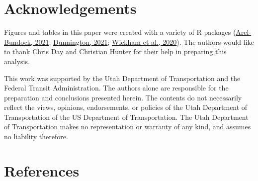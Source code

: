 \documentclass[3p, authoryear, review]{elsarticle} %
\begin{document}
\hypertarget{acks}{%
\section*{Acknowledgements}\label{acks}}

Figures and tables in this paper were created with a variety of R
packages (\protect\hyperlink{ref-R-modelsummary}{Arel-Bundock, 2021}; \protect\hyperlink{ref-R-ggspatial}{Dunnington, 2021}; \protect\hyperlink{ref-R-ggplot2}{Wickham et al., 2020}). The authors would like to thank
Chris Day and Christian Hunter for their help in preparing this analysis.

This work was supported by the Utah Department of Transportation and the
Federal Transit Administration. The authors alone are responsible for the
preparation and conclusions presented herein. The contents do not necessarily
reflect the views, opinions, endorsements, or policies of the Utah Department of
Transportation of the US Department of Transportation. The Utah Department of
Transportation makes no representation or warranty of any kind, and assumes no
liability therefore.

\hypertarget{references}{%
\section*{References}\label{references}}
\end{document}
